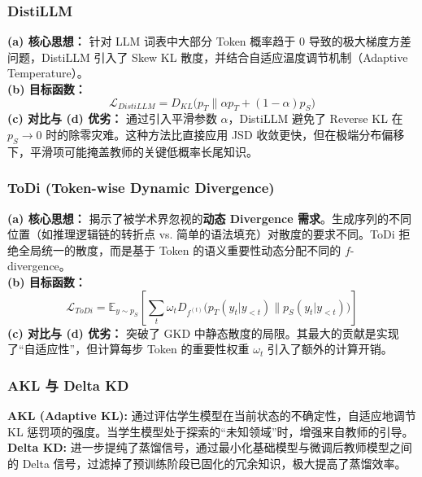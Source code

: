 \subsubsection{DistiLLM \cite{ko2024distilllm}}
\textbf{(a) 核心思想：} 针对 LLM 词表中大部分 Token 概率趋于 0 导致的极大梯度方差问题，DistiLLM 引入了 Skew KL 散度，并结合自适应温度调节机制（Adaptive Temperature）。\\
\textbf{(b) 目标函数：}
\begin{equation}
    \mathcal{L}_{DistiLLM} = D_{KL}\big(p_T \parallel \alpha p_T + (1-\alpha) p_S\big)
\end{equation}
\textbf{(c) 对比与 (d) 优劣：} 通过引入平滑参数 $\alpha$，DistiLLM 避免了 Reverse KL 在 $p_S \to 0$ 时的除零灾难。这种方法比直接应用 JSD 收敛更快，但在极端分布偏移下，平滑项可能掩盖教师的关键低概率长尾知识。

\subsubsection{ToDi (Token-wise Dynamic Divergence) \cite{todi2025}}
\textbf{(a) 核心思想：} 揭示了被学术界忽视的\textbf{动态 Divergence 需求}。生成序列的不同位置（如推理逻辑链的转折点 vs. 简单的语法填充）对散度的要求不同。ToDi 拒绝全局统一的散度，而是基于 Token 的语义重要性动态分配不同的 $f$-divergence。\\
\textbf{(b) 目标函数：} 
\begin{equation}
    \mathcal{L}_{ToDi} = \mathbb{E}_{y \sim p_S} \left[ \sum_t \omega_t D_{f^{(t)}} \big( p_T(y_t|y_{<t}) \parallel p_S(y_t|y_{<t}) \big) \right]
\end{equation}
\textbf{(c) 对比与 (d) 优劣：} 突破了 GKD 中静态散度的局限。其最大的贡献是实现了“自适应性”，但计算每步 Token 的重要性权重 $\omega_t$ 引入了额外的计算开销。

\subsubsection{AKL 与 Delta KD \cite{akl2024, deltakd2025}}
\textbf{AKL (Adaptive KL):} 通过评估学生模型在当前状态的不确定性，自适应地调节 KL 惩罚项的强度。当学生模型处于探索的“未知领域”时，增强来自教师的引导。\\
\textbf{Delta KD:} 进一步提纯了蒸馏信号，通过最小化基础模型与微调后教师模型之间的 Delta 信号，过滤掉了预训练阶段已固化的冗余知识，极大提高了蒸馏效率。

